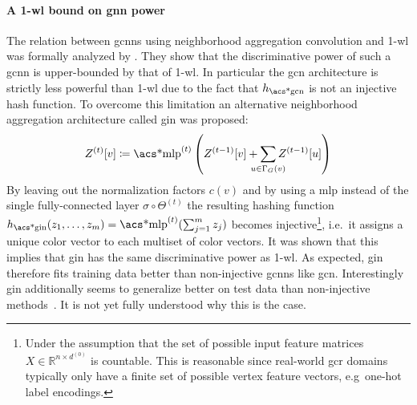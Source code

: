 \paragraph{A 1-\acs{wl} bound on \ac{gnn} power}
The relation between \acp{gcnn} using neighborhood aggregation convolution and 1-\acs{wl} was formally analyzed by \citet{Xu2018}.
They show that the discriminative power of such a \ac{gcnn} is upper-bounded by that of 1-\acs{wl}.
In particular the \ac{gcn} architecture is strictly less powerful than 1-\acs{wl} due to the fact that $h_{\text{\acs*{gcn}}}$ is not an injective hash function.
To overcome this limitation an alternative neighborhood aggregation architecture called \ac{gin} was proposed:
\begin{align}
	Z^{(t)}[v] \coloneqq \text{\acs*{mlp}}^{(t)}\left( Z^{(t-1)}[v] + \smashoperator[lr]{\sum_{u \in \Gamma_G(v)}} Z^{(t-1)}[u] \right)
\end{align}
By leaving out the normalization factors $c(v)$ and by using a \ac{mlp} instead of the single fully-connected layer $\sigma \circ \Theta^{(t)}$ the resulting hashing function $h_{\text{\acs*{gin}}}(z_1, \dots, z_m) = \text{\acs*{mlp}}^{(t)}(\sum_{j=1}^{m} z_j)$ becomes injective\footnote{
	Under the assumption that the set of possible input feature matrices $X \in \mathbb{R}^{n \times d^{(0)}}$ is countable.
	This is reasonable since real-world \ac{gcr} domains typically only have a finite set of possible vertex feature vectors, e.g\ one-hot label encodings.
}, i.e.\ it assigns a unique color vector to each multiset of color vectors.
It was shown that this implies that \ac{gin} has the same discriminative power as 1-\ac{wl}.
As expected, \ac{gin} therefore fits training data better than non-injective \acp{gcnn} like \ac{gcn}.
Interestingly \ac{gin} additionally seems to generalize better on test data than non-injective methods~\cite{Xu2018}\cite{Errica2020}.
It is not yet fully understood why this is the case.

